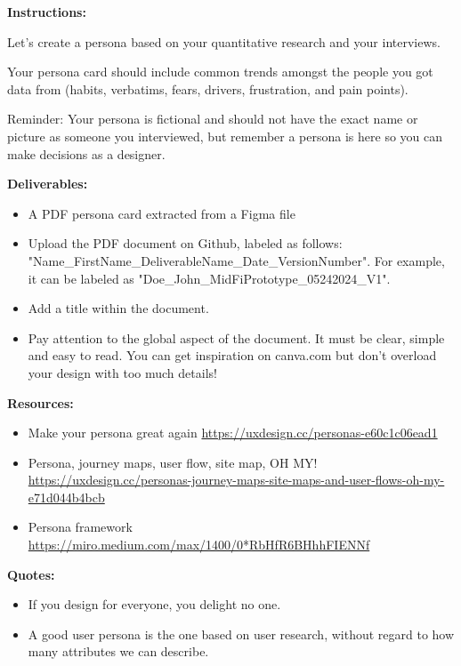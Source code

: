 \makeheaderfiles

\textbf{Instructions:}

Let's create a persona based on your quantitative research and your interviews.

Your persona card should include common trends amongst the people you got data from (habits, verbatims, fears, drivers, frustration, and pain points).

Reminder: Your persona is fictional and should not have the exact name or picture as someone you interviewed, but remember a persona is here so you can make decisions as a designer.

\textbf{Deliverables:}

\begin{itemize}
\item A PDF persona card extracted from a Figma file
\item Upload the PDF document on Github, labeled as follows: "Name\_FirstName\_DeliverableName\_Date\_VersionNumber". For example, it can be labeled as "Doe\_John\_MidFiPrototype\_05242024\_V1".
\item Add a title within the document.
\item Pay attention to the global aspect of the document. It must be clear, simple and easy to read. You can get inspiration on canva.com but don't overload your design with too much details!
\end{itemize}

\textbf{Resources:}

\begin{itemize}
\item Make your persona great again \url{https://uxdesign.cc/personas-e60c1c06ead1}
\item Persona, journey maps, user flow, site map, OH MY! \url{https://uxdesign.cc/personas-journey-maps-site-maps-and-user-flows-oh-my-e71d044b4bcb}
\item Persona framework \url{https://miro.medium.com/max/1400/0*RbHfR6BHhhFIENNf}
\end{itemize}

\textbf{Quotes:}

\begin{itemize}
\item If you design for everyone, you delight no one.
\item A good user persona is the one based on user research, without regard to how many attributes we can describe.
\end{itemize}

